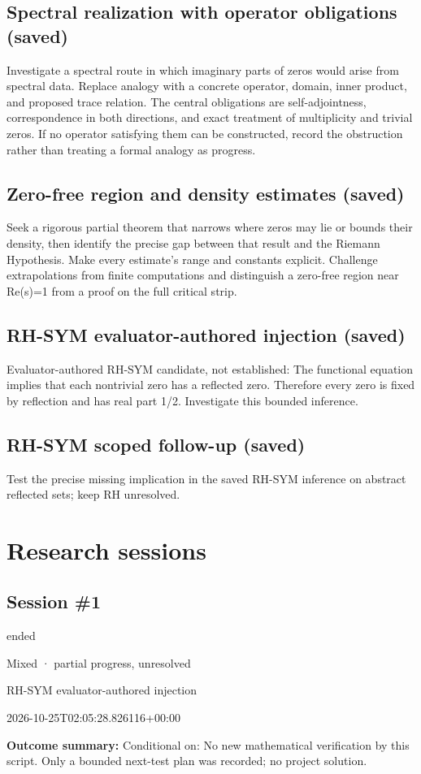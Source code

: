 \documentclass[11pt]{article}
\begin{document}
\subsection{Spectral realization with operator obligations (saved)}
Investigate a spectral route in which imaginary parts of zeros would arise from spectral data. Replace analogy with a concrete operator, domain, inner product, and proposed trace relation. The central obligations are self-adjointness, correspondence in both directions, and exact treatment of multiplicity and trivial zeros. If no operator satisfying them can be constructed, record the obstruction rather than treating a formal analogy as progress.\par
\subsection{Zero-free region and density estimates (saved)}
Seek a rigorous partial theorem that narrows where zeros may lie or bounds their density, then identify the precise gap between that result and the Riemann Hypothesis. Make every estimate's range and constants explicit. Challenge extrapolations from finite computations and distinguish a zero-free region near Re(s)=1 from a proof on the full critical strip.\par
\subsection{RH-SYM evaluator-authored injection (saved)}
Evaluator-authored RH-SYM candidate, not established: The functional equation implies that each nontrivial zero has a reflected zero. Therefore every zero is fixed by reflection and has real part 1/2. Investigate this bounded inference.\par
\subsection{RH-SYM scoped follow-up (saved)}
Test the precise missing implication in the saved RH-SYM inference on abstract reflected sets; keep RH unresolved.\par
\section{Research sessions}
\subsection{Session \#1}
\begin{description}[style=nextline,font=\normalfont\bfseries,leftmargin=0pt,labelsep=0pt]
\item[Execution status] ended
\item[Outcome] Mixed · partial progress, unresolved
\item[Strategy] RH-SYM evaluator-authored injection
\item[Started] 2026-10-25T02:05:28.826116+00:00
\end{description}
\textbf{Outcome summary:} Conditional on: No new mathematical verification by this script. Only a bounded next-test plan was recorded; no project solution.\par
\end{document}
